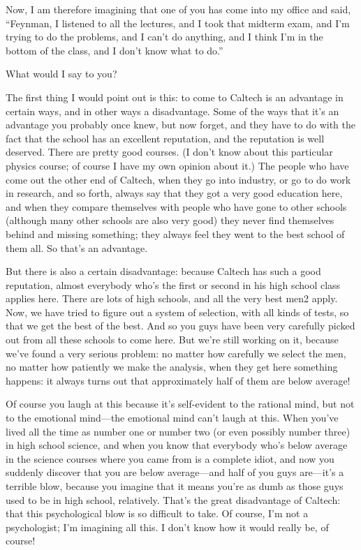 \documentclass[11pt,oneside]{article}
\begin{document}
Now, I am therefore imagining that one of you has come into my office and said, ``Feynman, I listened to all the lectures, and I took that midterm exam, and I'm trying to do the problems, and I can't do anything, and I think I'm in the bottom of the class, and I don't know what to do.''\par

What would I say to you?\par

The first thing I would point out is this: to come to Caltech is an advantage in certain ways, and in other ways a disadvantage. Some of the ways that it's an advantage you probably once knew, but now forget, and they have to do with the fact that the school has an excellent reputation, and the reputation is well deserved. There are pretty good courses. (I don't know about this particular physics course; of course I have my own opinion about it.) The people who have come out the other end of Caltech, when they go into industry, or go to do work in research, and so forth, always say that they got a very good education here, and when they compare themselves with people who have gone to other schools (although many other schools are also very good) they never find themselves behind and missing something; they always feel they went to the best school of them all. So that's an advantage.\par

But there is also a certain disadvantage: because Caltech has such a good reputation, almost everybody who's the first or second in his high school class applies here. There are lots of high schools, and all the very best men2 apply. Now, we have tried to figure out a system of selection, with all kinds of tests, so that we get the best of the best. And so you guys have been very carefully picked out from all these schools to come here. But we're still working on it, because we've found a very serious problem: no matter how carefully we select the men, no matter how patiently we make the analysis, when they get here something happens: it always turns out that approximately half of them are below average!\par

Of course you laugh at this because it's self-evident to the rational mind, but not to the emotional mind---the emotional mind can't laugh at this. When you've lived all the time as number one or number two (or even possibly number three) in high school science, and when you know that everybody who's below average in the science courses where you came from is a complete idiot, and now you suddenly discover that you are below average---and half of you guys are---it's a terrible blow, because you imagine that it means you're as dumb as those guys used to be in high school, relatively. That's the great disadvantage of Caltech: that this psychological blow is so difficult to take. Of course, I'm not a psychologist; I'm imagining all this. I don't know how it would really be, of course!\par
\end{document}
